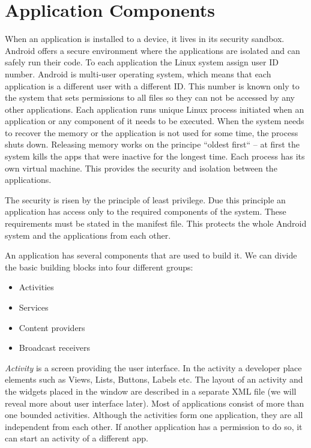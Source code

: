 \section{Application Components}
When an application is installed to a device, it lives in its security sandbox.
Android offers a secure environment where the applications are isolated and can safely run their code.
To each application the Linux system assign user ID number. 
Android is multi-user operating system, which means that each application is a different user with a different ID.
This number is known only to the system that sets permissions to all files so they can not be accessed by any other applications.
Each application runs unique Linux process initiated when an application or any component of it needs to be executed.
When the system needs to recover the memory or the application is not used for some time, the process shuts down.
Releasing memory works on the principe ``oldest first`` -- at first the system kills the apps that were inactive for the longest time.
Each process has its own virtual machine. This provides the security and isolation between the applications.

The security is risen by the principle of least privilege.
Due this principle an application has access only to the required components of the system. 
These requirements must be stated in the manifest file.
This protects the whole Android system and the applications from each other.

An application has several components that are used to build it.
We can divide the basic building blocks into four different groups:
\begin{itemize}
\item{Activities}
\item{Services}
\item{Content providers}
\item{Broadcast receivers}
\end{itemize}

\emph{Activity} is a screen providing the user interface.
In the activity a developer place elements such as Views, Lists, Buttons, Labels etc. 
The layout of an activity and the widgets placed in the window are described in a separate XML file (we will reveal more about user interface later).
Most of applications consist of more than one bounded activities.
Although the activities form one application, they are all independent from each other.
If another application has a permission to do so, it can start an activity of a different app.


